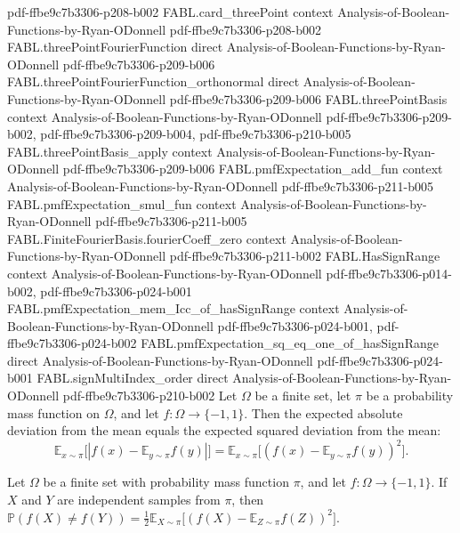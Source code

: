 \begin{theorem}
  {pdf-ffbe9c7b3306-p208-b002}
\proofstep
  {FABL.card_threePoint}
  {context}
  {Analysis-of-Boolean-Functions-by-Ryan-ODonnell}
  {pdf-ffbe9c7b3306-p208-b002}
\proofstep
  {FABL.threePointFourierFunction}
  {direct}
  {Analysis-of-Boolean-Functions-by-Ryan-ODonnell}
  {pdf-ffbe9c7b3306-p209-b006}
\proofstep
  {FABL.threePointFourierFunction_orthonormal}
  {direct}
  {Analysis-of-Boolean-Functions-by-Ryan-ODonnell}
  {pdf-ffbe9c7b3306-p209-b006}
\proofstep
  {FABL.threePointBasis}
  {context}
  {Analysis-of-Boolean-Functions-by-Ryan-ODonnell}
  {pdf-ffbe9c7b3306-p209-b002,
    pdf-ffbe9c7b3306-p209-b004,
    pdf-ffbe9c7b3306-p210-b005}
\proofstep
  {FABL.threePointBasis_apply}
  {context}
  {Analysis-of-Boolean-Functions-by-Ryan-ODonnell}
  {pdf-ffbe9c7b3306-p209-b006}
\proofstep
  {FABL.pmfExpectation_add_fun}
  {context}
  {Analysis-of-Boolean-Functions-by-Ryan-ODonnell}
  {pdf-ffbe9c7b3306-p211-b005}
\proofstep
  {FABL.pmfExpectation_smul_fun}
  {context}
  {Analysis-of-Boolean-Functions-by-Ryan-ODonnell}
  {pdf-ffbe9c7b3306-p211-b005}
\proofstep
  {FABL.FiniteFourierBasis.fourierCoeff_zero}
  {context}
  {Analysis-of-Boolean-Functions-by-Ryan-ODonnell}
  {pdf-ffbe9c7b3306-p211-b002}
\proofstep
  {FABL.HasSignRange}
  {context}
  {Analysis-of-Boolean-Functions-by-Ryan-ODonnell}
  {pdf-ffbe9c7b3306-p014-b002,
    pdf-ffbe9c7b3306-p024-b001}
\proofstep
  {FABL.pmfExpectation_mem_Icc_of_hasSignRange}
  {context}
  {Analysis-of-Boolean-Functions-by-Ryan-ODonnell}
  {pdf-ffbe9c7b3306-p024-b001,
    pdf-ffbe9c7b3306-p024-b002}
\proofstep
  {FABL.pmfExpectation_sq_eq_one_of_hasSignRange}
  {direct}
  {Analysis-of-Boolean-Functions-by-Ryan-ODonnell}
  {pdf-ffbe9c7b3306-p024-b001}
\proofstep
  {FABL.signMultiIndex_order}
  {direct}
  {Analysis-of-Boolean-Functions-by-Ryan-ODonnell}
  {pdf-ffbe9c7b3306-p210-b002}
Let $\Omega$ be a finite set, let $\pi$ be a probability mass function on $\Omega$, and
let $f:\Omega\to\{-1,1\}$. Then the expected absolute deviation from the mean equals the
expected squared deviation from the mean:
\[\mathbb{E}_{x\sim\pi}\bigl[|f(x)-\mathbb{E}_{y\sim\pi}f(y)|\bigr]=\mathbb{E}_{x\sim\pi}\bigl[(f(x)-\mathbb{E}_{y\sim\pi}f(y))^2\bigr].\]
\end{theorem}

\begin{theorem}
\label{FABL.pmfExpectation_independent_disagreement_eq_half_variance}
\leanok
{}
Let $\Omega$ be a finite set with probability mass function $\pi$, and let
$f:\Omega\to\{-1,1\}$. If $X$ and $Y$ are independent samples from $\pi$, then
$\mathbb{P}(f(X)\ne
f(Y))=\frac12\mathbb{E}_{X\sim\pi}\bigl[(f(X)-\mathbb{E}_{Z\sim\pi}f(Z))^2\bigr]$.
\end{theorem}

